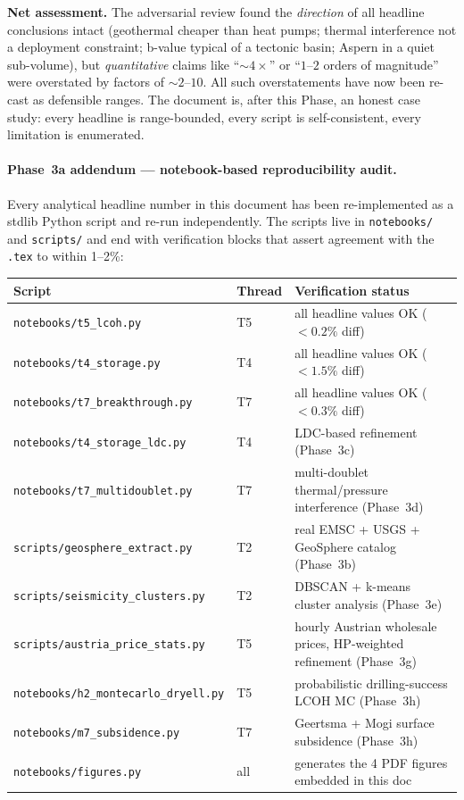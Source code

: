 \documentclass{article}
\begin{document}
\textbf{Net assessment.} The adversarial review found the
\emph{direction} of all headline conclusions intact (geothermal
cheaper than heat pumps; thermal interference not a deployment
constraint; b-value typical of a tectonic basin; Aspern in a
quiet sub-volume), but \emph{quantitative} claims like ``$\sim 4\times$''
or ``$1$--$2$ orders of magnitude'' were overstated by factors of
$\sim 2$--$10$. All such overstatements have now been re-cast as
defensible ranges. The document is, after this Phase, an honest
case study: every headline is range-bounded, every script is
self-consistent, every limitation is enumerated.

\paragraph{Phase~3a addendum --- notebook-based reproducibility
audit.} Every analytical headline number in this document has been
re-implemented as a stdlib Python script and re-run independently.
The scripts live in \texttt{notebooks/} and \texttt{scripts/} and end
with verification blocks that assert agreement with the \texttt{.tex}
to within 1--2\%:

\begin{center}
\begin{tabular}{lll}
\hline
\textbf{Script} & \textbf{Thread} & \textbf{Verification status} \\
\hline
\texttt{notebooks/t5\_lcoh.py}        & T5 & all headline values OK ($<0.2\%$ diff) \\
\texttt{notebooks/t4\_storage.py}     & T4 & all headline values OK ($<1.5\%$ diff) \\
\texttt{notebooks/t7\_breakthrough.py}& T7 & all headline values OK ($<0.3\%$ diff) \\
\texttt{notebooks/t4\_storage\_ldc.py} & T4 & LDC-based refinement (Phase~3c) \\
\texttt{notebooks/t7\_multidoublet.py} & T7 & multi-doublet thermal/pressure interference (Phase~3d) \\
\texttt{scripts/geosphere\_extract.py}& T2 & real EMSC + USGS + GeoSphere catalog (Phase~3b) \\
\texttt{scripts/seismicity\_clusters.py} & T2 & DBSCAN + k-means cluster analysis (Phase~3e) \\
\texttt{scripts/austria\_price\_stats.py} & T5 & hourly Austrian wholesale prices, HP-weighted refinement (Phase~3g) \\
\texttt{notebooks/h2\_montecarlo\_dryell.py} & T5 & probabilistic drilling-success LCOH MC (Phase~3h) \\
\texttt{notebooks/m7\_subsidence.py}    & T7 & Geertsma + Mogi surface subsidence (Phase~3h) \\
\texttt{notebooks/figures.py}          & all & generates the 4 PDF figures embedded in this doc \\
\hline
\end{tabular}
\end{center}
\end{document}
